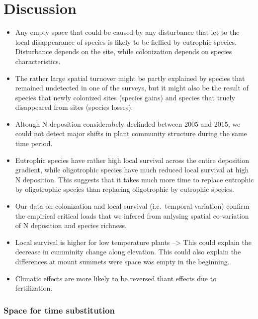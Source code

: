 \documentclass[fleqn,10pt,lineno]{wlpeerj} %
\theoremstyle{definition}
\theoremstyle{definition}
\theoremstyle{definition}
\theoremstyle{remark}
\begin{document}
\section*{Discussion}\label{discussion}

\begin{itemize}
\item
  Any empty space that could be caused by any disturbance that let to
  the local disappearance of species is likely to be fiellied by
  eutrophic species. Disturbance depends on the site, while colonization
  depends on species characteristics.
\item
  The rather large spatial turnover might be partly explained by species
  that remained undetected in one of the surveys, but it might also be
  the result of species that newly colonized sites (species gains) and
  species that truely disappeared from sites (species losses).
\item
  Altough N deposition considerabely declinded between 2005 and 2015, we
  could not detect major shifts in plant community structure during the
  same time period.
\item
  Eutrophic species have rather high local survival across the entire
  deposition gradient, while oligotrophic species have much reduced
  local survival at high N deposition. This suggests that it takes much
  more time to replace eutrophic by oligotrophic species than replacing
  oligotrophic by eutrophic species.
\item
  Our data on colonization and local survival (i.e.~temporal variation)
  confirm the empirical critical loads that we infered from anlysing
  spatial co-variation of N deposition and species richness.
\item
  Local survival is higher for low temperature plants --\textgreater{}
  This could explain the decrease in cumminity change along elevation.
  This could also explain the differences at mount summets were space
  was empty in the beginning.
\item
  Climatic effects are more likely to be reversed thant effects due to
  fertilization.
\end{itemize}

\subsubsection{Space for time
substitution}\label{space-for-time-substitution}
\end{document}
